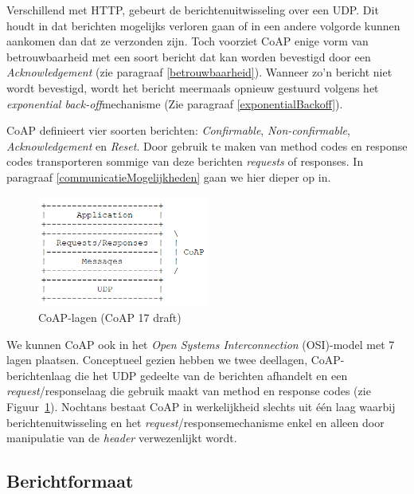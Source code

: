 Verschillend met HTTP, gebeurt de berichtenuitwisseling over een UDP. Dit houdt in dat berichten mogelijks verloren gaan of in een andere volgorde kunnen aankomen dan dat ze verzonden zijn. Toch voorziet CoAP enige vorm van betrouwbaarheid met een soort bericht dat kan worden bevestigd door een \textit{Acknowledgement} (zie paragraaf \ref{betrouwbaarheid}). Wanneer zo'n bericht niet wordt bevestigd, wordt het bericht meermaals opnieuw gestuurd volgens het \textit{exponential back-off}mechanisme (Zie paragraaf \ref{exponentialBackoff}).

CoAP definieert vier soorten berichten: \textit{Confirmable}, \textit{Non-confirmable}, \textit{Acknowledgement} en \textit{Reset}. Door gebruik te maken van method codes en response codes transporteren sommige van deze berichten \textit{requests} of responses. In paragraaf \ref{communicatieMogelijkheden} gaan we hier dieper op in.\\

\begin{figure}
\vspace{-10pt}
\includegraphics[width=0.5\textwidth]{fig/CoAPLaag}
\vspace{-30pt}
\caption{CoAP-lagen (CoAP 17 draft)}
\vspace{-5pt}
\label{fig:CoAPLaag}
\end{figure}
We kunnen CoAP ook in het \textit{Open Systems Interconnection} (OSI)-model  met 7 lagen plaatsen. Conceptueel gezien hebben we twee deellagen, CoAP-berichtenlaag die het UDP gedeelte van de berichten afhandelt en een \textit{request}/responselaag die gebruik maakt van method en response codes (zie Figuur~\ref{fig:CoAPLaag}). Nochtans bestaat CoAP in werkelijkheid slechts uit \'{e}\'{e}n laag waarbij berichtenuitwisseling en het \textit{request}/responsemechanisme enkel en alleen door manipulatie van de \textit{header} verwezenlijkt wordt.

\subsection{Berichtformaat}

